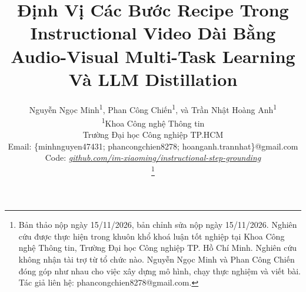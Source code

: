 \documentclass{IEEEtran}
\begin{document}
\title{Định Vị Các Bước Recipe Trong Instructional Video Dài Bằng Audio-Visual Multi-Task Learning Và LLM Distillation}
\author{\begin{tabular}{c}
Nguyễn Ngọc Minh\textsuperscript{1}, Phan Công Chiến\textsuperscript{1}, và Trần Nhật Hoàng Anh\textsuperscript{1}\\
\textsuperscript{1}Khoa Công nghệ Thông tin\\
Trường Đại học Công nghiệp TP.HCM\\
Email: \{minhnguyen47431; phancongchien8278; hoanganh.trannhat\}@gmail.com\\
Code: {\mdseries\itshape\color{blue!70!black}\href{https://github.com/im-xiaoming/instructional-step-grounding}{github.com/im-xiaoming/instructional-step-grounding}}
\end{tabular}%
\thanks{Bản thảo nộp ngày 15/11/2026, bản chỉnh sửa nộp ngày 15/11/2026. Nghiên cứu được thực hiện trong khuôn khổ khoá luận tốt nghiệp tại Khoa Công nghệ Thông tin, Trường Đại học Công nghiệp TP. Hồ Chí Minh. Nghiên cứu không nhận tài trợ từ tổ chức nào. Nguyễn Ngọc Minh và Phan Công Chiến đóng góp như nhau cho việc xây dựng mô hình, chạy thực nghiệm và viết bài. Tác giả liên hệ: phancongchien8278@gmail.com.}}

\maketitle
\end{document}

